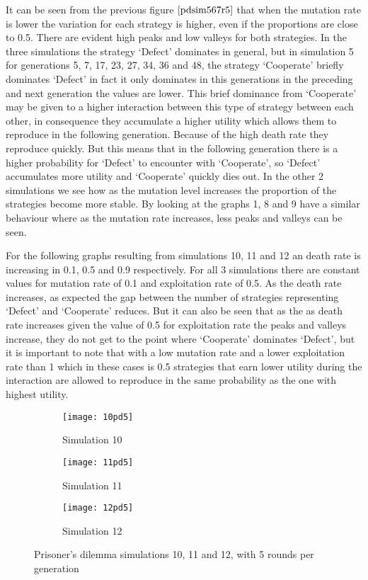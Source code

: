 It can be seen from the previous figure $\ref{pdsim567r5}$ that when the mutation rate is lower the variation for each strategy is higher, even if the proportions are close to 0.5. There are evident high peaks and low valleys  for both strategies. In the three simulations the strategy `Defect' dominates in general, but in simulation 5  for generations 5, 7, 17, 23, 27, 34, 36 and 48, the strategy `Cooperate' briefly dominates `Defect' in fact it only dominates in this generations in the preceding and next generation the values are lower. This brief dominance from `Cooperate' may be given to a higher interaction between this type of strategy between each other, in consequence they accumulate a higher utility which allows them to reproduce in the following generation. Because of the high death rate they reproduce quickly. But this means that in the following generation there is a higher probability for `Defect' to encounter with `Cooperate', so `Defect' accumulates more utility and  `Cooperate' quickly dies out. In the other 2 simulations we see how as the mutation level increases the proportion of the strategies become more stable. By looking at the graphs 1, 8 and 9 have a similar behaviour where as the mutation rate increases, less peaks and valleys can be seen.



For the following graphs resulting from simulations 10, 11 and 12 an death rate is increasing in 0.1, 0.5 and 0.9 respectively. For all 3 simulations there are constant values for mutation rate of 0.1 and exploitation rate of 0.5. As the death rate increases, as expected the gap between the number of strategies representing `Defect' and `Cooperate' reduces. But it can also be seen that as the as death rate increases given the value of 0.5 for exploitation rate the peaks and valleys increase, they do not get to the point where `Cooperate' dominates `Defect', but it is important to note that with a low mutation rate and a lower exploitation rate than 1 which in these cases is 0.5 strategies that earn lower utility during the interaction are allowed to reproduce in the same probability as the one with highest utility. 

\begin{figure}[H]       
    \centering
    \begin{subfigure}[b]{0.3\textwidth}
	\centering
	{\texttt{[image: 10pd5]}}   
    	\caption{Simulation 10}
	\label{fig:pds10}
    \end{subfigure}
    \hfill
    \begin{subfigure}[b]{0.3\textwidth}
	\centering
	{\texttt{[image: 11pd5]}}   
    	\caption{Simulation 11}
	\label{fig:pds11}
    \end{subfigure}
    \hfill
    \begin{subfigure}[b]{0.3\textwidth}
	\centering
	{\texttt{[image: 12pd5]}}   
    	\caption{Simulation 12}
	\label{fig:pds12}
    \end{subfigure}
    \caption{Prisoner's dilemma simulations 10, 11 and 12, with 5 rounds per generation}
    \label{pdsim101112r5}
\end{figure}


